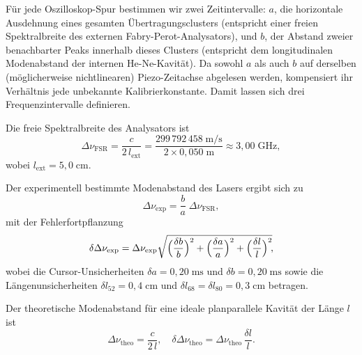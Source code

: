  Für jede Oszilloskop-Spur bestimmen wir zwei Zeitintervalle: $a$, die horizontale Ausdehnung eines gesamten Übertragungsclusters (entspricht einer freien Spektralbreite des externen Fabry-Perot-Analysators), und $b$, der Abstand zweier benachbarter Peaks innerhalb dieses Clusters (entspricht dem longitudinalen Modenabstand der internen He-Ne-Kavität). 
 Da sowohl $a$ als auch $b$ auf derselben (möglicherweise nichtlinearen) Piezo-Zeitachse abgelesen werden, kompensiert ihr Verhältnis jede unbekannte Kalibrierkonstante. Damit lassen sich drei Frequenzintervalle definieren.

Die freie Spektralbreite des Analysators ist
\begin{equation}
  \Delta\nu_{\mathrm{FSR}}
  = \frac{c}{2\,l_{\mathrm{ext}}}
  = \frac{299\,792\,458\;\mathrm{m/s}}{2 \times 0{,}050\;\mathrm{m}}
  \approx 3{,}00\;\mathrm{GHz},
\end{equation}
wobei $l_{\mathrm{ext}} = 5{,}0\;\mathrm{cm}$.

Der experimentell bestimmte Modenabstand des Lasers ergibt sich zu
\begin{equation}
 \Delta\nu_{\mathrm{exp}}
  = \frac{b}{a}\;\Delta\nu_{\mathrm{FSR}},
\end{equation}
mit der Fehlerfortpflanzung
\begin{equation}
  \delta\Delta\nu_{\mathrm{exp}}
  =\Delta\nu_{\mathrm{exp}}
    \sqrt{\Bigl(\frac{\delta b}{b}\Bigr)^{2}
        + \Bigl(\frac{\delta a}{a}\Bigr)^{2}
        + \Bigl(\frac{\delta l}{l}\Bigr)^{2}}\!,
\end{equation}
wobei die Cursor-Unsicherheiten $\delta a = 0{,}20\;\mathrm{ms}$ und $\delta b = 0{,}20\;\mathrm{ms}$ sowie die Längenunsicherheiten $\delta l_{52} = 0{,}4\;\mathrm{cm}$ und $\delta l_{68} = \delta l_{80} = 0{,}3\;\mathrm{cm}$ betragen.

Der theoretische Modenabstand für eine ideale planparallele Kavität der Länge $l$ ist
\begin{equation}
 \Delta\nu_{\mathrm{theo}}
  = \frac{c}{2\,l},
  \quad
  \delta\Delta\nu_{\mathrm{theo}}
  =\Delta\nu_{\mathrm{theo}}\,\frac{\delta l}{l}.
\end{equation}

